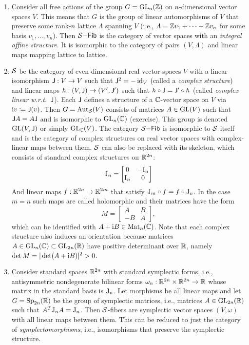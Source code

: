 \begin{example}
\begin{enumerate}
        \item Consider all free actions of the group $G=\operatorname{GL}_n(\mathbb{Z})$ on $n$-dimensional vector spaces $V$. This means that $G$ is the group of linear automorphisms of $V$ that preserve some rank-$n$ lattice $\varLambda$ spanning $V$ (i.e., $\varLambda=\mathbb{Z} v_1+\cdots +\mathbb{Z} v_n$ for some basis $v_1,\ldots,v_n$). Then $\mathcal{S}\mathsf{-Fib}$ is the category of vector spaces with an \emph{integral affine structure}. It is isomorphic to the category of pairs $(V,\varLambda)$ and linear maps mapping lattice to lattice.

        \item $\mathcal{S}$ be the category of even-dimensional real vector spaces $V$ with a linear isomorphism $\mathsf{J}:V\to V$ such that $\mathsf{J}^2=-\operatorname{id}_V$ (called a \emph{complex structure}) and linear maps $h:(V,\mathsf{J})\to(V',\mathsf{J}')$ such that $h\circ \mathsf{J}=\mathsf{J}'\circ h$ (called \emph{complex linear w.r.t.\ $\mathsf{J}$}). Each $\mathsf{J}$ defines a structure of a $\mathbb{C}$-vector space on $V$ via $\mathrm{i} v\coloneqq\mathsf{J}(v)$. Then $G=\operatorname{Aut}_{\mathcal{S}}(V)$ consists of matrices $A\in\operatorname{GL}(V)$ such that $\mathsf{J} A=A\mathsf{J}$ and is isomorphic to $\operatorname{GL}_n(\mathbb{C})$ (exercise). This group is denoted $\operatorname{GL}(V,\mathsf{J})$ or simply $\operatorname{GL}_{\mathbb{C}}(V)$. The category $\mathcal{S}\mathsf{-Fib}$ is isomorphic to $\mathcal{S}$ itself and is the category of complex structures on real vector spaces with complex-linear maps between them. $\mathcal{S}$ can also be replaced with its skeleton, which consists of standard complex structures on $\mathbb{R}^{2n}$:
        \[\mathrm{J}_{n}=\begin{bmatrix}
            0&-\mathrm{I}_n\\
            \mathrm{I}_n&0
        \end{bmatrix}\]
        And linear maps $f:\mathbb{R}^{2n}\to \mathbb{R}^{2m}$ that satisfy $\mathrm{J}_{m}\circ f=f\circ \mathrm{J}_{n}$. In the case $m=n$ such maps are called holomorphic and their matrices have the form 
        \[M=\begin{bmatrix}
            A&B\\
            -B&A
        \end{bmatrix},\label{eq complex matrices}\]
        which can be identified with $A+\mathrm{i} B\in \operatorname{Mat}_n(\mathbb{C})$.
        Note that each complex structure also induces an orientation because matrices $A\in \operatorname{GL}_n(\mathbb{C})\subset \operatorname{GL}_{2n}(\mathbb{R})$ have positive determinant over $\mathbb{R}$, namely $\det M=|\det(A+\mathrm{i} B)|^2>0$.

        \item Consider standard spaces $\mathbb{R}^{2n}$ with standard symplectic forms, i.e., antisymmetric nondegenerate bilinear forms $\omega_n:\mathbb{R}^{2n}\times \mathbb{R}^{2n}\to \mathbb{R}$ whose matrix in the standard basis is $\mathrm{J}_{n}$. Let morphisms be all linear maps and let $G=\operatorname{Sp}_{2n}(\mathbb{R})$ be the group of symplectic matrices, i.e., matrices $A\in\operatorname{GL}_{2n}(\mathbb{R})$ such that $A^T\mathrm{J}_{n}A=\mathrm{J}_{n}$. Then $\mathcal{S}$-fibers are symplectic vector spaces $(V,\omega)$ with all linear maps between them. This can be reduced to just the category of \emph{symplectomorphisms}, i.e., isomorphisms that preserve the symplectic structure.
    \end{enumerate}
\end{example}


